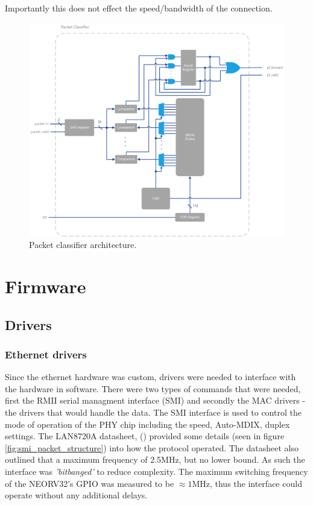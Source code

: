 Importantly this does not effect the speed/bandwidth of the connection. 


\begin{figure}[h]
    \centering
    \includegraphics[width=1\textwidth]{Images/PacketFilterArchitecture.png}
    \caption[Packet classifier architecture]{Packet classifier architecture.}
    \label{fig:soc_architecture}
\end{figure}




\section{Firmware}







\subsection{Drivers}
\subsubsection{Ethernet drivers}
Since the ethernet hardware was custom, drivers were needed to interface with the hardware in software. There were two types of commands that were needed, first the RMII serial managment interface (SMI) and secondly the MAC drivers - the drivers that would handle the data.  The SMI interface is used to control the mode of operation of the PHY chip including the speed, Auto-MDIX, duplex settings. The LAN8720A datasheet, (\cite{LAN8720ADatasheet}) provided some details (seen in figure \ref{fig:smi_packet_structure}) into how the protocol operated. The datasheet also outlined that a maximum frequency of 2.5MHz, but no lower bound. As such the interface was \textit{'bitbanged'} to reduce complexity. The maximum switching frequency of the NEORV32's GPIO was measured to be $\approx 1$MHz, thus the interface could operate without any additional delays.


